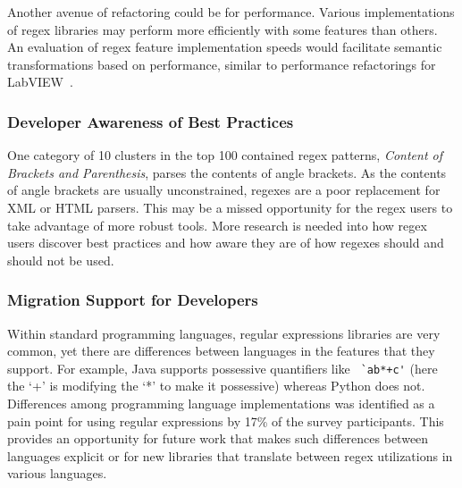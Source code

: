 Another avenue of refactoring could be for performance. Various implementations of regex libraries may perform more efficiently with some features than others. An evaluation of regex feature implementation speeds would facilitate semantic transformations based on performance, similar to performance refactorings for LabVIEW~\cite{chambers2013smell, chambers2015impact}.



\subsubsection{Developer Awareness of Best Practices}
One category of 10 clusters in the top 100 contained regex patterns, \emph{Content of Brackets and Parenthesis}, parses the contents of angle brackets.  As the contents of angle brackets are usually unconstrained, regexes are a poor replacement for XML or HTML parsers.  This may be a missed opportunity for the regex users to take advantage of more robust tools. More research is needed into how regex users discover best practices and how aware they are of how regexes should and should not be used.

\subsubsection{Migration  Support for Developers}
Within standard programming languages, regular expressions libraries are very common, yet there are  differences between languages in the features that they support. For example, Java supports possessive quantifiers like \verb! `ab*+c'! (here the `+' is modifying the `*' to make it possessive) whereas Python does not. Differences among programming language implementations was identified as a pain point for using regular expressions by 17\% of the survey participants. This provides an opportunity for future work that makes such differences between languages explicit or for new libraries that translate between regex utilizations in various languages.

